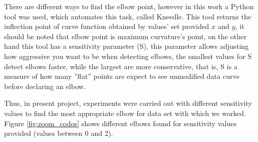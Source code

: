 There are different ways to find the elbow point, however in this work a Python tool was used, which automates this task, called Kneedle. This tool returns the inflection point of curve function obtained by values' set provided $x$ and $y$, it should be noted that elbow point is maximum curvature's point, on the other hand this tool has a sensitivity parameter (S), this parameter allows adjusting how aggressive you want to be when detecting elbows, the smallest values for S detect elbows faster, while the largest are more conservative, that is, S is a measure of how many ''flat'' points are expect to see unmodified data curve before declaring an elbow.

\vspace{5mm} %

Thus, in present project, experiments were carried out with different sensitivity values to find the most appropriate elbow for data set with which we worked. Figure \ref{fig:zoom_codos} shows different elbows found for sensitivity values provided (values between 0 and 2).

